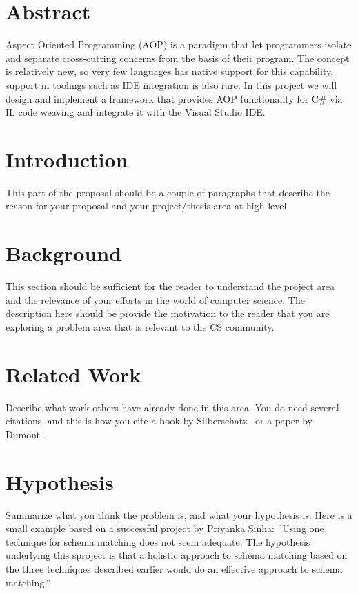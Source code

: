 \section*{Abstract}
Aspect Oriented Programming (AOP) is a paradigm that let programmers isolate and separate cross-cutting concerns from the basis of their program. The concept is relatively new, so very few languages has native support for this capability, support in toolings such as IDE integration is also rare. In this project we will design and implement a framework that provides AOP functionality for C\# via IL code weaving and integrate it with the Visual Studio IDE.
\vfill{}

\setcounter{page}{0} 
\newpage{}

\section{Introduction}
This part of the proposal should be a couple of paragraphs that
describe the reason for your proposal and your project/thesis area at
high level.

\section{Background}
This section should be sufficient for the reader to understand the
project area and the relevance of your efforts in the world of
computer science. The description here should be provide the
motivation to the reader that you are exploring a problem area that is
relevant to the CS community.


\section{Related Work}
Describe what work others have already done in this area. You do need
several citations, and this is how you cite a book by
Silberschatz~\cite{Silberschatz05-text} or a paper by
Dumont~\cite{Dumont2007-robots}.

\section{Hypothesis}
Summarize what you think the problem is, and what your hypothesis
is. Here is a small example based on a successful project by Priyanka
Sinha: ''Using one technique for schema matching does not seem
adequate. The hypothesis underlying this sproject is that a holistic
approach to schema matching based on the three techniques described
earlier would do an effective approach to schema matching.''

